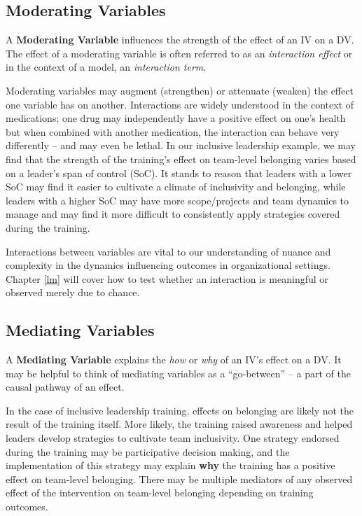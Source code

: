 \documentclass[
]{book}
\begin{document}
\hypertarget{moderating-variables}{%
\subsection{Moderating Variables}\label{moderating-variables}}

A \textbf{Moderating Variable} influences the strength of the effect of an IV on a DV. The effect of a moderating variable is often referred to as an \emph{interaction effect} or in the context of a model, an \emph{interaction term}.

Moderating variables may augment (strengthen) or attenuate (weaken) the effect one variable has on another. Interactions are widely understood in the context of medications; one drug may independently have a positive effect on one's health but when combined with another medication, the interaction can behave very differently -- and may even be lethal. In our inclusive leadership example, we may find that the strength of the training's effect on team-level belonging varies based on a leader's span of control (SoC). It stands to reason that leaders with a lower SoC may find it easier to cultivate a climate of inclusivity and belonging, while leaders with a higher SoC may have more scope/projects and team dynamics to manage and may find it more difficult to consistently apply strategies covered during the training.

Interactions between variables are vital to our understanding of nuance and complexity in the dynamics influencing outcomes in organizational settings. Chapter \ref{lm} will cover how to test whether an interaction is meaningful or observed merely due to chance.

\hypertarget{mediating-variables}{%
\subsection{Mediating Variables}\label{mediating-variables}}

A \textbf{Mediating Variable} explains the \emph{how} or \emph{why} of an IV's effect on a DV. It may be helpful to think of mediating variables as a ``go-between'' -- a part of the causal pathway of an effect.

In the case of inclusive leadership training, effects on belonging are likely not the result of the training itself. More likely, the training raised awareness and helped leaders develop strategies to cultivate team inclusivity. One strategy endorsed during the training may be participative decision making, and the implementation of this strategy may explain \textbf{why} the training has a positive effect on team-level belonging. There may be multiple mediators of any observed effect of the intervention on team-level belonging depending on training outcomes.
\end{document}
